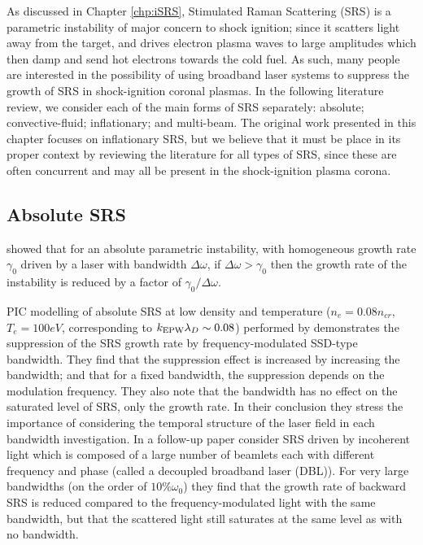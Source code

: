 As discussed in Chapter \ref{chp:iSRS}, Stimulated Raman Scattering (\acrshort{SRS}) is a parametric instability of major concern to shock ignition; since it scatters light away from the target, and drives electron plasma waves to large amplitudes which then damp and send hot electrons towards the cold fuel. As such, many people are interested in the possibility of using broadband laser systems to suppress the growth of SRS in shock-ignition coronal plasmas. In the following literature review, we consider each of the main forms of SRS separately: absolute; convective-fluid; inflationary; and multi-beam. The original work presented in this chapter focuses on inflationary SRS, but we believe that it must be place in its proper context by reviewing the literature for all types of SRS, since these are often concurrent and may all be present in the shock-ignition plasma corona.

\subsection{Absolute SRS}
\citet{Thomson1974} showed that for an absolute parametric instability, with homogeneous growth rate $\gamma_0$ driven by a laser with bandwidth $\Delta\omega$, if $\Delta\omega > \gamma_0$ then the growth rate of the instability is reduced by a factor of $\gamma_0/\Delta\omega$.

PIC modelling of absolute SRS at low density and temperature ($n_e=0.08n_{cr}$, $T_e=100\si{eV}$, corresponding to $k_\mathrm{EPW}\lambda_D\sim 0.08$)
performed by \citet{Zhao2015} demonstrates the suppression of the SRS growth rate by frequency-modulated SSD-type bandwidth. They find that the suppression effect is increased by increasing the bandwidth; and that for a fixed bandwidth, the suppression depends on the modulation frequency. They also note that the bandwidth has no effect on the saturated level of SRS, only the growth rate. In their conclusion they stress the importance of considering the temporal structure of the laser field in each bandwidth investigation. In a follow-up paper \citet{Zhao2017July} consider SRS driven by incoherent light which is composed of a large number of beamlets each with different frequency and phase (called a decoupled broadband laser (DBL)).  For very large bandwidths (on the order of $10\%\omega_0$) they find that the growth rate of backward SRS is reduced compared to the frequency-modulated light with the same bandwidth, but that the scattered light still saturates at the same level as with no bandwidth.  

